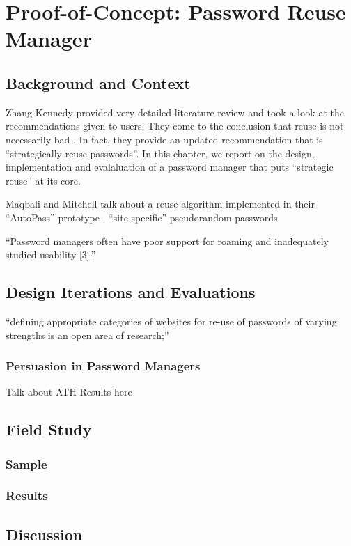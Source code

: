 \chapter[Proof-of-Concept: Password Reuse Manager]{Proof-of-Concept: Password Reuse Manager}\label{chap:pwrm}

\section{Background and Context}

Zhang-Kennedy \etal provided very detailed literature review and took a look at the recommendations given to users. They come to the conclusion that reuse is not necessarily bad \cite[p.8-9]{ZhangKennedy2016RevisitingPasswordRules}. In fact, they provide an updated recommendation that is ``strategically reuse passwords''. In this chapter, we report on the design, implementation and evalaluation of a password manager that puts ``strategic reuse'' at its core. 


Maqbali and Mitchell talk about a reuse algorithm implemented in their ``AutoPass'' prototype \cite{Maqbali2016PasswordGenerators}.
``site-specific'' pseudorandom passwords

``Password managers often have poor support for roaming and inadequately studied usability [3].'' \cite{Herley2012PersistenceOfPasswords}

\section{Design Iterations and Evaluations}

``defining appropriate categories of websites for re-use of passwords of varying strengths is an open area of research;'' \cite{Wash2016UnderstandingPasswordChoices} 

\subsection{Persuasion in Password Managers}
Talk about ATH Results here


\section{Field Study}
\subsection{Sample}
\subsection{Results}

\section{Discussion}


